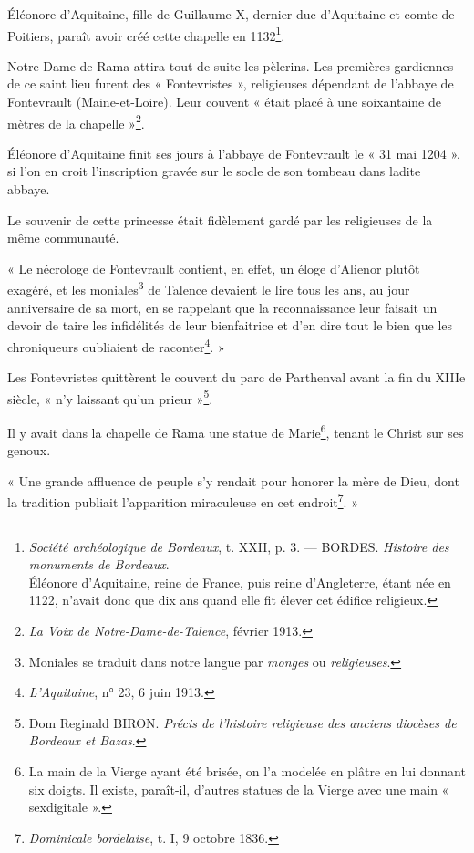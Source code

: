 \documentclass[a4paper,11pt]{book}
\begin{document}
Éléonore d'Aquitaine, fille de Guillaume X, dernier duc d'Aquitaine et comte de Poitiers, paraît avoir créé cette chapelle en 1132\footnote{\textit{Société archéologique de Bordeaux}, t. XXII, p. 3. — BORDES. \textit{Histoire des monuments de Bordeaux}.\\Éléonore d'Aquitaine, reine de France, puis reine d'Angleterre, étant née en 1122, n'avait donc que dix ans quand elle fit élever cet édifice religieux.}.

Notre-Dame de Rama attira tout de suite les pèlerins. Les premières gardiennes de ce saint lieu furent des « Fontevristes », religieuses dépendant de l'abbaye de Fontevrault (Maine-et-Loire). Leur couvent « était placé à une soixantaine de mètres de la chapelle »\footnote{\textit{La Voix de Notre-Dame-de-Talence}, février 1913.}.

Éléonore d'Aquitaine finit ses jours à l'abbaye de Fontevrault le « 31 mai 1204 », si l'on en croit l'inscription gravée sur le socle de son tombeau dans ladite abbaye.

Le souvenir de cette princesse était fidèlement gardé par les religieuses de la même communauté.

« Le nécrologe de Fontevrault contient, en effet, un éloge d'Alienor plutôt exagéré, et les moniales\footnote{Moniales se traduit dans notre langue par \textit{monges} ou \textit{religieuses}.} de Talence devaient le lire tous les ans, au jour anniversaire de sa mort, en se rappelant que la reconnaissance leur faisait un devoir de taire les infidélités de leur bienfaitrice et d'en dire tout le bien que les chroniqueurs oubliaient de raconter\footnote{\textit{L'Aquitaine}, n° 23, 6 juin 1913.}. »

Les Fontevristes quittèrent le couvent du parc de Parthenval avant la fin du XIIIe siècle, « n'y laissant qu'un prieur »\footnote{Dom Reginald BIRON. \textit{Précis de l'histoire religieuse des anciens diocèses de Bordeaux et Bazas}.}. 

Il y avait dans la chapelle de Rama une statue de Marie\footnote{La main de la Vierge ayant été brisée, on l'a modelée en plâtre en lui donnant six doigts. Il existe, paraît-il, d'autres statues de la Vierge avec une main « sexdigitale ».}, tenant le Christ sur ses genoux.

« Une grande affluence de peuple s'y rendait pour honorer la mère de Dieu, dont la tradition publiait l'apparition miraculeuse en cet endroit\footnote{\textit{Dominicale bordelaise}, t. I\ier{}, 9 octobre 1836.}. »
\end{document}
